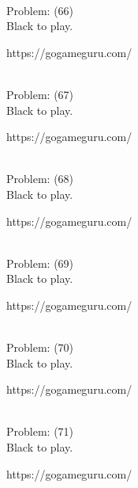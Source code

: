 \documentclass[11pt]{article}
\begin{document}
\begin{minipage}[t]{0.5\textwidth}
  {\centering
  
\\
Problem: (66)\\
Black to play.

https://gogameguru.com/\\
  }
\end{minipage}
\begin{minipage}[t]{0.5\textwidth}
  {\centering
  
\\
Problem: (67)\\
Black to play.

https://gogameguru.com/\\
  }
\end{minipage}
\begin{minipage}[t]{0.5\textwidth}
  {\centering
  
\\
Problem: (68)\\
Black to play.

https://gogameguru.com/\\
  }
\end{minipage}
\begin{minipage}[t]{0.5\textwidth}
  {\centering
  
\\
Problem: (69)\\
Black to play.

https://gogameguru.com/\\
  }
\end{minipage}
\begin{minipage}[t]{0.5\textwidth}
  {\centering
  
\\
Problem: (70)\\
Black to play.

https://gogameguru.com/\\
  }
\end{minipage}
\begin{minipage}[t]{0.5\textwidth}
  {\centering
  
\\
Problem: (71)\\
Black to play.

https://gogameguru.com/\\
  }
\end{minipage}
\end{document}
